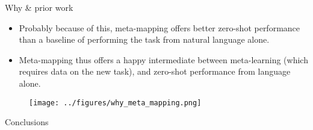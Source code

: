 \documentclass[final]{beamer}
\begin{document}
\begin{frame}[t]{}
\begin{columns}
\begin{column}[t]{0.248\textwidth}
\begin{block}{\huge Why \& prior work}
\begin{itemize}
\item Probably because of this, meta-mapping offers better zero-shot performance than a baseline of performing the task from natural language alone.
\item Meta-mapping thus offers a happy intermediate between meta-learning (which requires data on the new task), and zero-shot performance from language alone.
\end{itemize}
\begin{figure}[H]
\centering
\texttt{[image: ../figures/why\_meta\_mapping.png]}
\label{fig_why_meta_mapping}
\end{figure}

\end{block}
\begin{block}{\huge Conclusions}
\end{block}
\end{column}
\end{columns}
\end{frame}
\end{document}

